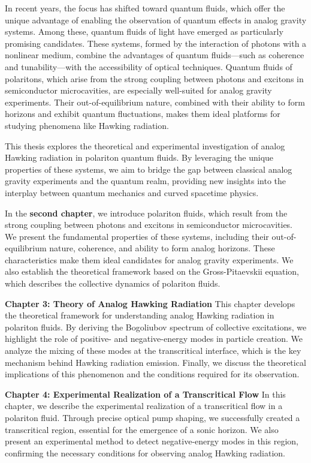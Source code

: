 In recent years, the focus has shifted toward quantum fluids, which offer the unique advantage of enabling the observation of quantum effects in analog gravity systems. Among these, quantum fluids of light have emerged as particularly promising candidates. 
These systems, formed by the interaction of photons with a nonlinear medium, combine the advantages of quantum fluids—such as coherence and tunability—with the accessibility of optical techniques. Quantum fluids of polaritons, which arise from the strong coupling between photons and excitons in semiconductor microcavities, are especially well-suited for analog gravity experiments. 
Their out-of-equilibrium nature, combined with their ability to form horizons and exhibit quantum fluctuations, makes them ideal platforms for studying phenomena like Hawking radiation.

This thesis explores the theoretical and experimental investigation of analog Hawking radiation in polariton quantum fluids. 
By leveraging the unique properties of these systems, we aim to bridge the gap between classical analog gravity experiments and the quantum realm, providing new insights into the interplay between quantum mechanics and curved spacetime physics.

  
In the \textbf{second chapter}, we introduce polariton fluids, which result from the strong coupling between photons and excitons in semiconductor microcavities. We present the fundamental properties of these systems, including their out-of-equilibrium nature, coherence, and ability to form analog horizons. These characteristics make them ideal candidates for analog gravity experiments. 
We also establish the theoretical framework based on the Gross-Pitaevskii equation, which describes the collective dynamics of polariton fluids.

\textbf{Chapter 3: Theory of Analog Hawking Radiation}  
This chapter develops the theoretical framework for understanding analog Hawking radiation in polariton fluids. By deriving the Bogoliubov spectrum of collective excitations, we highlight the role of positive- and negative-energy modes in particle creation. 
We analyze the mixing of these modes at the transcritical interface, which is the key mechanism behind Hawking radiation emission. Finally, we discuss the theoretical implications of this phenomenon and the conditions required for its observation.

\textbf{Chapter 4: Experimental Realization of a Transcritical Flow}  
In this chapter, we describe the experimental realization of a transcritical flow in a polariton fluid. Through precise optical pump shaping, we successfully created a transcritical region, essential for the emergence of a sonic horizon. We also present an experimental method to detect negative-energy modes in this region, confirming the necessary conditions for observing analog Hawking radiation.

